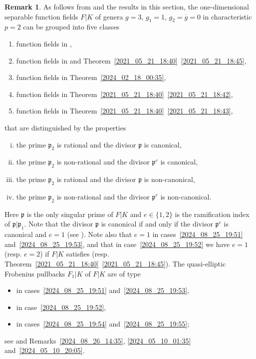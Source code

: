 \documentclass[12pt,reqno]{amsart}
\theoremstyle{definition}
\newtheorem{rem}[thm]{Remark}
\newcommand{\ov}{\overline}
\newcommand{\pp}{\mathfrak{p}}
\begin{document}
\begin{rem}\label{2024_08_25_19:50}
As follows from \cite[Section~3]{HiSt23} and the results in this section, the one-dimensional separable function fields $F|K$ of genera $g=3$, $g_1=1$, $g_2=\ov g = 0$ in characteristic $p=2$ can be grouped into five classes
\begin{enumerate}[\upshape (i)]
    \item \label{2024_08_25_19:51}
    function fields in \cite[Theorem~3.1~(i)]{HiSt23},
    \item \label{2024_08_25_19:52}
    function fields in \cite[Theorem~3.1~(ii)]{HiSt23} and Theorem~\ref{2021_05_21_18:40}~\ref{2021_05_21_18:45},
    \item \label{2024_08_25_19:53}
    function fields in Theorem~\ref{2024_02_18_00:35},
    \item \label{2024_08_25_19:54}
    function fields in Theorem~\ref{2021_05_21_18:40}~\ref{2021_05_21_18:42},
    \item \label{2024_08_25_19:55}
    function fields in Theorem~\ref{2021_05_21_18:40}~\ref{2021_05_21_18:43},
\end{enumerate}
that are distinguished by the properties
\begin{enumerate}[(i)]
    \item the prime $\pp_2$ is rational and the divisor $\pp$ is canonical,
    \item the prime $\pp_2$ is non-rational and the divisor $\pp^e$ is canonical,
    \item the prime $\pp_2$ is rational and the divisor $\pp$ is non-canonical,
    \item[(iv),(v)] the prime $\pp_2$ is non-rational and the divisor $\pp^e$ is non-canonical.
\end{enumerate}
Here $\pp$ is the only singular prime of $F|K$ and $e\in\{1,2\}$ is the ramification index of $\pp|\pp_1$.
Note that the divisor $\pp$ is canonical if and only if the divisor $\pp^e$ is canonical and $e=1$ (see \cite[Lemma~3.2]{HiSt23}).
Note also that $e=1$ in cases~\ref{2024_08_25_19:51} and~\ref{2024_08_25_19:53}, and that in case~\ref{2024_08_25_19:52} we have $e=1$ (resp. $e=2$) if $F|K$ satisfies \cite[Theorem~3.1~(ii)]{HiSt23} (resp. Theorem~\ref{2021_05_21_18:40}~\ref{2021_05_21_18:45}).
The quasi-elliptic Frobenius pullbacks $F_1|K$ of $F|K$ are of type
\begin{itemize}
    \item \cite[Theorem~2.1~(i)]{HiSt23} in cases~\ref{2024_08_25_19:51} and~\ref{2024_08_25_19:53}, 
    \item \cite[Theorem~2.1~(iii)]{HiSt23} in case~\ref{2024_08_25_19:52}, 
    \item \cite[Theorem~2.1, (ii) or (iii)]{HiSt23} in cases~\ref{2024_08_25_19:54} and~\ref{2024_08_25_19:55};
\end{itemize}
see \cite[Remark~3.4]{HiSt23} and Remarks~\ref{2024_08_26_14:35}, \ref{2024_05_10_01:35} and~\ref{2024_05_10_20:05}.


\end{rem}
\end{document}
